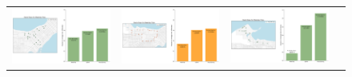 \documentclass[b4paper]{article}
\begin{document}
\begin{figure}
\begin{center}
\begin{tabular}{ cccc }
  \includegraphics[width=44mm]{Route_81.png}  &   \includegraphics[width=44mm]{Route_82.png}  & \includegraphics[width=44mm]{Route_84.png}  &  \\ 

\end{tabular}
\end{center}
\end{figure}
\end{document}
